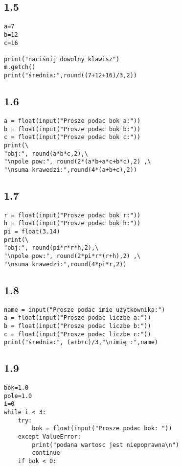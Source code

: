 \documentclass[a4paper,11pt]{article}
\begin{document}
\begin{multicols}{2}
\begin{flushleft}
\subsection*{1.5}
\begin{verbatim}
a=7
b=12
c=16

print("naciśnij dowolny klawisz")
m.getch()
print("średnia:",round((7+12+16)/3,2))
\end{verbatim}

\begin{minipage}{3cm}
\subsection*{1.6}
\begin{verbatim}
a = float(input("Prosze podac bok a:"))
b = float(input("Prosze podac bok b:"))
c = float(input("Prosze podac bok c:"))
print(\
"obj:", round(a*b*c,2),\
"\npole pow:", round(2*(a*b+a*c+b*c),2) ,\
"\nsuma krawedzi:",round(4*(a+b+c),2))
\end{verbatim}
\end{minipage}
\end{flushleft}
\begin{flushright}
\subsection*{1.7}
\begin{verbatim}
r = float(input("Prosze podac bok r:"))
h = float(input("Prosze podac bok h:"))
pi = float(3.14)
print(\
"obj:", round(pi*r*r*h,2),\
"\npole pow:", round(2*pi*r*(r+h),2) ,\
"\nsuma krawedzi:",round(4*pi*r,2))
\end{verbatim}

\subsection*{1.8}

\begin{verbatim}
name = input("Prosze podac imie użytkownika:")
a = float(input("Prosze podac liczbe a:"))
b = float(input("Prosze podac liczbe b:"))
c = float(input("Prosze podac liczbe c:"))
print("średnia:", (a+b+c)/3,"\nimię :",name)
\end{verbatim}

\subsection*{1.9}
\begin{verbatim}
bok=1.0
pole=1.0
i=0
while i < 3:
    try:
        bok = float(input("Prosze podac bok: "))
    except ValueError:
        print("podana wartosc jest niepoprawna\n")
        continue
    if bok < 0:
        

\end{verbatim}
\end{flushright}
\end{multicols}
\end{document}
